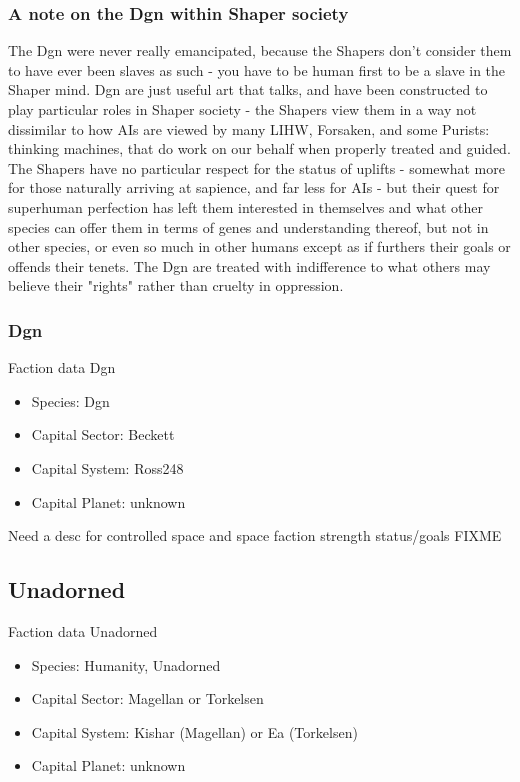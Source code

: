 \subsubsection{A note on the Dgn within Shaper society}
The Dgn were never really emancipated, because the Shapers don't
consider them to have ever been slaves as such - you have to be human
first to be a slave in the Shaper mind. Dgn are just useful art that
talks, and have been constructed to play particular roles in Shaper
society - the Shapers view them in a way not dissimilar to how AIs are
viewed by many LIHW, Forsaken, and some Purists: thinking machines,
that do work on our behalf when properly treated and guided. The
Shapers have no particular respect for the status of uplifts -
somewhat more for those naturally arriving at sapience, and far less
for AIs - but their quest for superhuman perfection has left them
interested in themselves and what other species can offer them in
terms of genes and understanding thereof, but not in other species, or
even so much in other humans except as if furthers their goals or
offends their tenets. The Dgn are treated with indifference to what
others may believe their "rights" rather than cruelty in oppression.

\subsubsection{Dgn}

Faction data Dgn
\begin{itemize}
\item Species: Dgn
\item Capital Sector: Beckett
\item Capital System: Ross248
\item Capital Planet: unknown
\end{itemize}

Need a desc for controlled space and space faction strength status/goals FIXME 

\subsection{Unadorned}

Faction data Unadorned
\begin{itemize}
\item Species: Humanity, Unadorned
\item Capital Sector: Magellan or Torkelsen
\item Capital System: Kishar (Magellan) or Ea (Torkelsen)
\item Capital Planet: unknown
\end{itemize}

